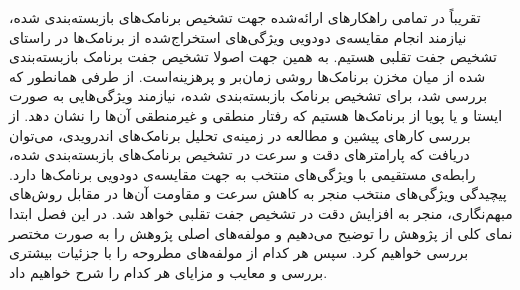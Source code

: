 

\label{ourwork}
تقریباً در تمامی راهکار‌های ارائه‌شده جهت تشخیص برنامک‌های بازبسته‌بندی شده، نیازمند انجام مقایسه‌ی دودویی ویژگی‌های استخراج‌شده از برنامک‌ها در راستای تشخیص جفت تقلبی هستیم. به همین جهت اصولا تشخیص جفت برنامک بازبسته‌بندی شده از میان مخزن‌ برنامک‌ها روشی زمان‌بر و پرهزینه‌است. از طرفی همانطور که بررسی شد، برای تشخیص برنامک‌ بازبسته‌بندی شده، نیازمند ویژگی‌هایی به صورت ایستا و یا پویا از برنامک‌ها هستیم که رفتار منطقی و غیرمنطقی آن‌ها را نشان دهد. از بررسی کار‌های پیشین و مطالعه‌ در زمینه‌ی تحلیل برنامک‌های اندرویدی، می‌توان دریافت که پارامتر‌های دقت و سرعت در تشخیص برنامک‌های بازبسته‌بندی شده، رابطه‌ی مستقیمی با ویژگی‌های منتخب به جهت مقایسه‌ی دودویی برنامک‌ها دارد. پیچیدگی ویژگی‌های منتخب منجر به کاهش سرعت و مقاومت آن‌ها در مقابل روش‌های مبهم‌نگاری، منجر به  افزایش دقت در تشخیص جفت تقلبی خواهد شد. در این فصل ابتدا نمای کلی از پژوهش را توضیح می‌دهیم و مولفه‌های اصلی پژوهش‌ را به صورت مختصر بررسی خواهیم کرد. سپس هر کدام از مولفه‌های مطروحه را با جزئیات بیشتری بررسی و معایب و مزایای هر کدام را شرح خواهیم داد.

